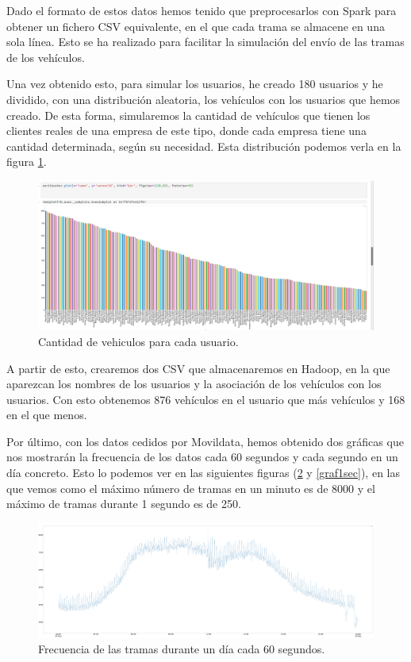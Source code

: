 Dado el formato de estos datos hemos tenido que preprocesarlos con Spark para obtener un fichero CSV equivalente, en el que cada trama se almacene en una sola línea. Esto se ha realizado para facilitar la simulación del envío de las tramas de los vehículos.\par

Una vez obtenido esto, para simular los usuarios, he creado 180 usuarios y he dividido, con una distribución aleatoria, los vehículos con los usuarios que hemos creado. De esta forma, simularemos la cantidad de vehículos que tienen los clientes reales de una empresa de este tipo, donde cada empresa tiene una cantidad determinada, según su necesidad. Esta distribución podemos verla en la figura \ref{userGraf}.\par

\begin{figure}[htp]
\centering
\includegraphics[scale=0.3]{Imagenes/graf1.png}
\caption{Cantidad de vehiculos para cada usuario.}
\label{userGraf}
\end{figure}

A partir de esto, crearemos dos CSV que almacenaremos en Hadoop, en la que aparezcan los nombres de los usuarios y la asociación de los vehículos con los usuarios. Con esto obtenemos 876 vehículos en el usuario que más vehículos y 168 en el que menos.\par
Por último, con los datos cedidos por Movildata, hemos obtenido dos gráficas que nos mostrarán la frecuencia de los datos cada 60 segundos y cada segundo en un día concreto. Esto lo podemos ver en las siguientes figuras (\ref{graf60sec} y \ref{graf1sec}), en las que vemos como el máximo número de tramas en un minuto es de 8000 y el máximo de tramas durante 1 segundo es de 250.\par

\begin{figure}[htp]
\centering
\includegraphics[scale=0.28]{Imagenes/graf2.png}
\caption{Frecuencia de las tramas durante un día cada 60 segundos.}
\label{graf60sec}
\end{figure}

